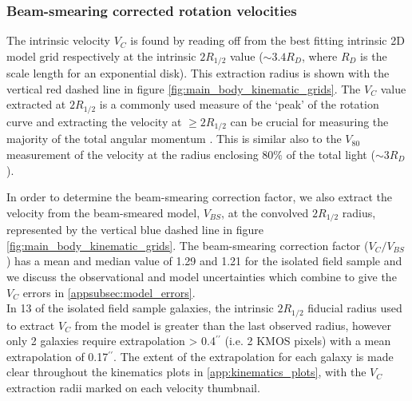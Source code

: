 \documentclass[fleqn,usenatbib]{mn2e}
\begin{document}
\subsubsection{Beam-smearing corrected rotation velocities}\label{subsubsec:beam_smearing_corrected_velocities}
The intrinsic velocity $V_{C}$ is found by reading off from the best fitting intrinsic 2D model grid respectively at the intrinsic $2R_{1/2}$ value ($\sim3.4R_{D}$, where $R_{D}$ is the scale length for an exponential disk).
This extraction radius is shown with the vertical red dashed line in figure \ref{fig:main_body_kinematic_grids}.
The $V_{C}$ value extracted at $2R_{1/2}$ is a commonly used measure of the `peak' of the rotation curve \citep[e.g.][]{Miller2011,Pelliccia2016,Stott2016,Harrison2017} and extracting the velocity at $\geqslant 2R_{1/2}$ can be crucial for measuring the majority of the total angular momentum \citep[e.g.][]{Obreschkow2015,Harrison2017,Swinbank2017}.
This is similar also to the $V_{80}$ measurement of the velocity at the radius enclosing 80$\%$ of the total light \citep{Tiley2016a} ($\sim3R_{D}$).

In order to determine the beam-smearing correction factor, we also extract the velocity from the beam-smeared model, $V_{BS}$, at the convolved $2R_{1/2}$ radius, represented by the vertical blue dashed line in figure \ref{fig:main_body_kinematic_grids}.
The beam-smearing correction factor ($V_{C}/V_{BS}$) has a mean and median value of 1.29 and 1.21 for the isolated field sample and we discuss the observational and model uncertainties which combine to give the $V_{C}$ errors in \cref{appsubsec:model_errors}. \\

In 13 of the isolated field sample galaxies, the intrinsic $2R_{1/2}$ fiducial radius used to extract $V_{C}$ from the model is greater than the last observed radius, however only 2 galaxies require extrapolation > 0.4$^{\prime\prime}$ (i.e. 2 KMOS pixels) with a mean extrapolation of 0.17$^{\prime\prime}$.
The extent of the extrapolation for each galaxy is made clear throughout the kinematics plots in \cref{app:kinematics_plots}, with the $V_{C}$ extraction radii marked on each velocity thumbnail.
\end{document}
